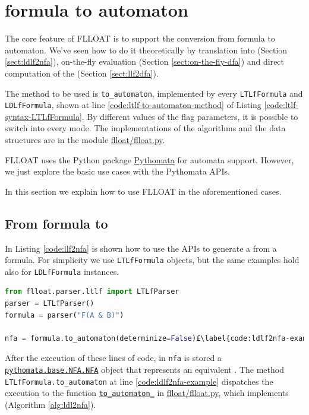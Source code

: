 \section{\LLf formula to automaton}
The core feature of FLLOAT is to support the conversion from \LLf formula to automaton. We've seen how to do it theoretically by translation into \NFA (Section \ref{sect:ldlf2nfa}), on-the-fly evaluation (Section \ref{sect:on-the-fly-dfa}) and direct computation of the \DFA (Section \ref{sect:llf2dfa}).

The method to be used is \texttt{to\_automaton}, implemented by every \texttt{LTLfFormula} and \texttt{LDLfFormula}, shown at line \ref{code:ltlf-to-automaton-method} of Listing \ref{code:ltlf-syntax-LTLfFormula}. By different values of the flag parameters, it is possible to switch into every mode. The implementations of the algorithms and the data structures are in the module \href{https://github.com/MarcoFavorito/flloat/blob/0.1.4/flloat/flloat.py}{flloat/flloat.py}.

FLLOAT uses the Python package \href{https://github.com/MarcoFavorito/pythomata}{Pythomata} for automata support. However, we just explore the basic use cases with the Pythomata APIs.

In this section we explain how to use FLLOAT in the aforementioned cases.

\subsection{From \LLf formula to \NFA}\label{sect:flloat-llf2nfa}
In Listing \ref{code:llf2nfa} is shown how to use the APIs to generate a \NFA from a \LLf formula. For simplicity we use \texttt{LTLfFormula} objects, but the same examples hold also for \texttt{LDLfFormula} instances.

\begin{lstlisting}[language=Python, style=Python, escapechar = £, label={code:llf2nfa}, caption={From \LLf to \NFA}]
from flloat.parser.ltlf import LTLfParser
parser = LTLfParser()
formula = parser("F(A & B)")

nfa = formula.to_automaton(determinize=False)£\label{code:ldlf2nfa-example}£

\end{lstlisting}

After the execution of these lines of code, in \texttt{nfa} is stored a \href{https://github.com/MarcoFavorito/pythomata/blob/master/pythomata/base/NFA.py}{\texttt{pythomata.base.NFA.NFA}} object that represents an equivalent \NFA. The method \texttt{LTLfFormula.to\_automaton} at line \ref{code:ldlf2nfa-example} dispatches the execution to the function \href{https://github.com/MarcoFavorito/flloat/blob/0.1.4/flloat/flloat.py#L48-L161}{\texttt{to\_automaton\_}} in \href{https://github.com/MarcoFavorito/flloat/blob/0.1.4/flloat/flloat.py}{flloat/flloat.py}, which implements \LDLfToNFA (Algorithm \ref{alg:ldl2nfa}). 

